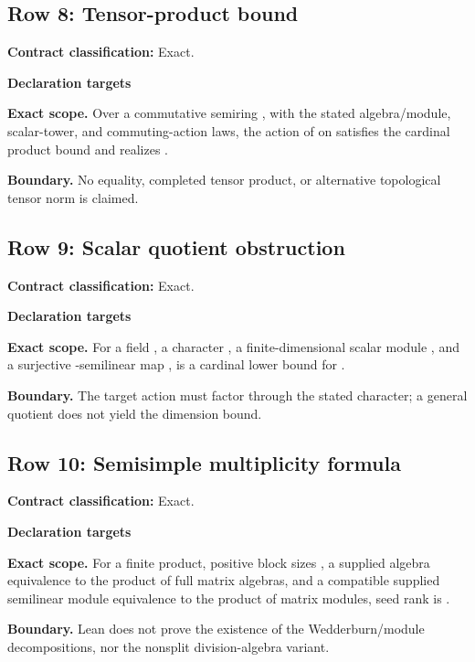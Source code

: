 \subsection{Row 8: Tensor-product bound}
\label{row:8}
\textbf{Contract classification:} Exact.
\par\smallskip\textbf{Declaration targets}\par
{\small\noindent{}\par}
{\small\noindent{}\par}
\medskip\noindent\textbf{Exact scope.} Over a commutative semiring , with the stated algebra/module, scalar-tower, and commuting-action laws, the action of  on  satisfies the cardinal product bound and realizes .
\par\smallskip\noindent\textbf{Boundary.} No equality, completed tensor product, or alternative topological tensor norm is claimed.
\medskip
\subsection{Row 9: Scalar quotient obstruction}
\label{row:9}
\textbf{Contract classification:} Exact.
\par\smallskip\textbf{Declaration targets}\par
{\small\noindent{}\par}
\medskip\noindent\textbf{Exact scope.} For a field , a character , a finite-dimensional scalar module , and a surjective -semilinear map ,  is a cardinal lower bound for .
\par\smallskip\noindent\textbf{Boundary.} The target action must factor through the stated character; a general quotient does not yield the dimension bound.
\medskip
\subsection{Row 10: Semisimple multiplicity formula}
\label{row:10}
\textbf{Contract classification:} Exact.
\par\smallskip\textbf{Declaration targets}\par
{\small\noindent{}\par}
{\small\noindent{}\par}
\medskip\noindent\textbf{Exact scope.} For a finite product, positive block sizes , a supplied algebra equivalence to the product of full matrix algebras, and a compatible supplied semilinear module equivalence to the product of  matrix modules, seed rank is .
\par\smallskip\noindent\textbf{Boundary.} Lean does not prove the existence of the Wedderburn/module decompositions, nor the nonsplit division-algebra variant.
\medskip
